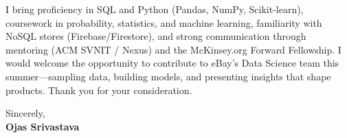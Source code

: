 \documentclass[a4paper,11pt]{article}
\begin{document}
I bring proficiency in SQL and Python (Pandas, NumPy, Scikit-learn), coursework in probability, statistics, and machine learning, familiarity with NoSQL stores (Firebase/Firestore), and strong communication through mentoring (ACM SVNIT / Nexus) and the McKinsey.org Forward Fellowship. I would welcome the opportunity to contribute to eBay's Data Science team this summer---sampling data, building models, and presenting insights that shape products. Thank you for your consideration.

Sincerely, \\
\vspace{8mm}
\textbf{Ojas Srivastava}
\end{document}
